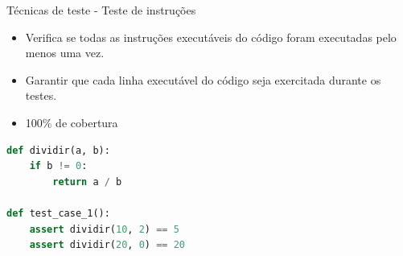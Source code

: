 
\begin{frame}[fragile]{Técnicas de teste - Teste de instruções}
    \begin{itemize}
        \item Verifica se todas as instruções executáveis do código foram executadas pelo menos uma vez.
        \item Garantir que cada linha executável do código seja exercitada durante os testes.
        \item 100\% de cobertura
    \end{itemize}

\begin{lstlisting}[language=Python]
def dividir(a, b):
    if b != 0:
        return a / b

def test_case_1():
    assert dividir(10, 2) == 5
    assert dividir(20, 0) == 20

\end{lstlisting}

\end{frame}